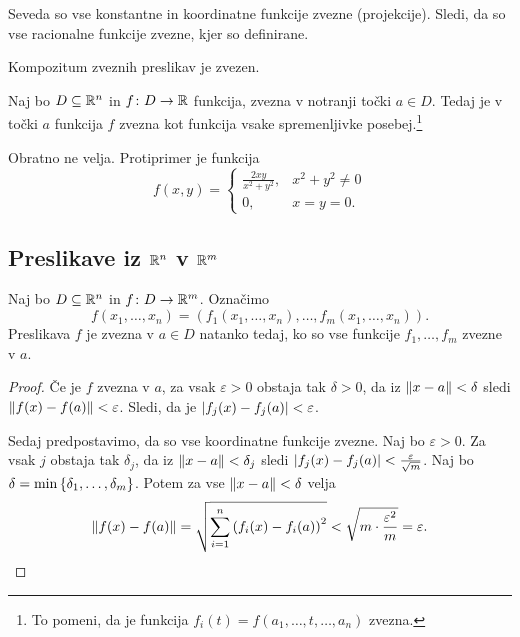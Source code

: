 \obvs

\begin{opomba}
Seveda so vse konstantne in koordinatne funkcije zvezne
(projekcije). Sledi, da so vse racionalne funkcije zvezne, kjer so
definirane.
\end{opomba}

\begin{opomba}
Kompozitum zveznih preslikav je zvezen.
\end{opomba}

\begin{izrek}
Naj bo $D \subseteq \mathbb{R}^n$ in $f \colon D \to \mathbb{R}$ funkcija, zvezna v
notranji točki $a \in D$. Tedaj je v točki $a$ funkcija $f$ zvezna
kot funkcija vsake spremenljivke posebej.\footnote{To pomeni, da je
funkcija $f_i(t) = f(a_1, \dots, t, \dots, a_n)$ zvezna.}
\end{izrek}

\obvs

\begin{opomba}
Obratno ne velja. Protiprimer je funkcija
\[
f(x,y)=\begin{cases}
\frac{2xy}{x^2+y^2},& x^2+y^2\ne 0 \\
0,& x=y=0.
\end{cases}
\]
\end{opomba}

\newpage

\subsection{Preslikave iz $\mathbb{R}^n$ v $\mathbb{R}^m$}

\begin{trditev}
Naj bo $D \subseteq \mathbb{R}^n$ in $f \colon D \to \mathbb{R}^m$. Označimo
\[
f(x_1, \dots, x_n) =
\left(f_1(x_1, \dots, x_n), \dots, f_m(x_1, \dots, x_n)\right).
\]
Preslikava $f$ je zvezna v $a \in D$ natanko tedaj, ko so vse
funkcije $f_1, \dots, f_m$ zvezne v $a$.
\end{trditev}

\begin{proof}
Če je $f$ zvezna v $a$, za vsak $\varepsilon > 0$ obstaja tak
$\delta > 0$, da iz $\left\lVert x - a\right\rVert < \delta$ sledi
$\left\lVert f(x) - f(a)\right\rVert < \varepsilon$. Sledi, da je
$\left\lvert f_j(x) - f_j(a)\right\rvert < \varepsilon$.

Sedaj predpostavimo, da so vse koordinatne funkcije zvezne. Naj bo
$\varepsilon > 0$. Za vsak $j$ obstaja tak $\delta_j$, da iz
$\left\lVert x - a\right\rVert < \delta_j$ sledi
$\left\lvert f_j(x) - f_j(a)\right\rvert < \frac{\varepsilon}{\sqrt{m}}$. Naj bo
$\delta = \min\left\{\delta_1, \dots, \delta_m\right\}$. Potem za vse
$\left\lVert x - a\right\rVert < \delta$ velja
\[
\left\lVert f(x) - f(a)\right\rVert =
\sqrt{\sum_{i=1}^n \left(f_i(x) - f_i(a)\right)^2} <
\sqrt{m \cdot \frac{\varepsilon^2}{m}} = \varepsilon. \qedhere
\]
\end{proof}

